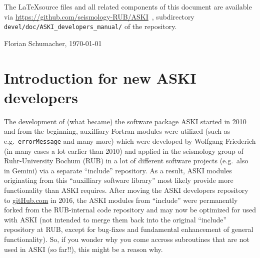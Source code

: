 \documentclass[12pt,a4paper]{article}
\newcommand{\lcode}[1]{\nolinkurl{#1}}
\newcommand{\ASKI}{ {\ttfamily ASKI} }
\begin{document}
The \LaTeX source files and all related components of this document are available via
\url{https://github.com/seismology-RUB/ASKI}~, subdirectory \lcode{devel/doc/ASKI_developers_manual/}
of the repository.
\begin{flushright}
Florian Schumacher, \mydate \today
\end{flushright}

%
\newpage
\tableofcontents
\newpage

\section{Introduction for new \ASKI{} developers} \label{sec:intro}
%
The development of (what became) the software package \ASKI{} started in 2010 and from the beginning, auxilliary
Fortran modules were utilized (such as e.g.\ \lcode{errorMessage} and many more) which were developed by
Wolfgang Friederich (in many cases a lot earlier than 2010) and applied in the seismology group of Ruhr-University
Bochum (RUB) in a lot of different software projects (e.g.\ also in Gemini) via a separate ``include'' repository. 
As a result, \ASKI{} modules 
originating from this ``auxilliary software library'' most likely provide more functionality than \ASKI{} 
requires. After moving the \ASKI{} developers repository to \url{gitHub.com} in 2016, the \ASKI{} modules from 
``include'' were permanently forked from the RUB-internal code repository and may now be optimized
for used with \ASKI{} (not intended to merge them back into the original ``include'' repository at RUB, except
for bug-fixes and fundamental enhancement of general functionality). So, if you wonder why you come accross 
subroutines that are not used in \ASKI{} (so far!!), this might be a reason why.
\end{document}
